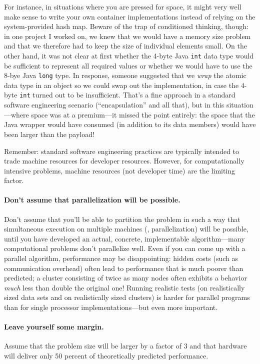 For instance, in situations where you are pressed for space, it might
very well make sense to write your own container implementations
instead of relying on the system-provided hash map.  Beware of the
trap of conditioned thinking, though: in one project I worked on, we
knew that we would have a memory\vadjust{\pagebreak} size problem and that we therefore
had to keep the size of individual elements small. On the other hand,
it was not clear at first whether the 4-byte Java \texttt{int} data
type would be sufficient to represent all required values or whether
we would have to use the 8-bye Java \texttt{long} type.  In response,
someone suggested that we \emph{wrap} the atomic data type in an
object so we could swap out the implementation, in case the 4-byte
\texttt{int} turned out to be insufficient.  That's a fine approach in
a standard software engineering scenario (``encapsulation'' and all
that), but in this situation---where space was at a premium---it
missed the point entirely: the space that the Java wrapper would have
consumed (in addition to its data members) would have been larger than
the payload!

Remember: standard software engineering practices are typically
intended to trade machine resources for developer resources.  However,
for computationally intensive problems, machine resources (not
developer time) are the limiting factor.

\paragraph{Don't assume that parallelization will be
possible.}  Don't assume that you'll be
able to partition the problem in such a way that simultaneous execution on
multiple machines (\ie, parallelization) will be possible, until you have
developed an actual, concrete, implementable algorithm---many computational
problems don't parallelize well. Even if you can come up with a parallel
algorithm, performance may be disappointing: hidden costs (such as
communication overhead) often lead to performance that is much poorer than
predicted; a cluster consisting of twice as many nodes often exhibits
a behavior \emph{much} less than double the original one! Running
realistic tests (on realistically sized data sets and on realistically
sized clusters) is harder for parallel programs than for single
processor implementations---but even more important.

\paragraph{Leave yourself some margin.}
Assume that the problem size will be larger by a factor of 3 and that
hardware will deliver only 50 percent of theoretically predicted
performance.

